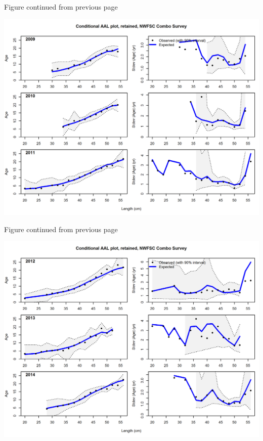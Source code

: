 \documentclass[12pt,]{article}
\begin{document}
\begin{center} 

            Figure continued from previous page 

            \end{center}

\includegraphics{./r4ss/plots_mod1/comp_condAALfit_Andre_plotsflt6mkt2_page3.png}

\begin{center} 

            Figure continued from previous page 

            \end{center}

\includegraphics{./r4ss/plots_mod1/comp_condAALfit_Andre_plotsflt6mkt2_page4.png}
\end{document}
